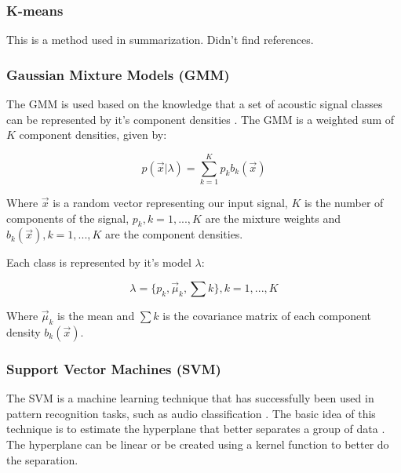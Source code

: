 \documentclass[12pt]{article}
\begin{document}
\subsubsection{K-means} \label{class:kmeans}

This is a method used in summarization. Didn't find references.

\subsubsection{Gaussian Mixture Models (GMM)} \label{class:gmm}


The GMM is used based on the knowledge that a set of acoustic signal classes can be represented by it's component densities \cite{reynolds1995robust}. The GMM is a weighted sum of $K$ component densities, given by:

\begin{equation}
	p(\vec{x}|\lambda) = \sum_{k=1}^{K} p_kb_k(\vec{x})
	\label{eq:gmm}
\end{equation}

Where $\vec{x}$ is a random vector representing our input signal, $K$ is the number of components of the signal, $p_k, k = 1,...,K$ are the mixture weights and $b_k(\vec{x}), k = 1,...,K$ are the component densities.

Each class is represented by it's model $\lambda$:

\begin{equation}
	\lambda = \{ p_k, \vec{\mu}_k, \sum k \}, k = 1,...,K
	\label{eq:lambda}
\end{equation}

Where $\vec{\mu}_k$ is the mean and $\sum k$ is the covariance matrix of each component density $b_k(\vec{x})$.



\subsubsection{Support Vector Machines (SVM)} \label{class:svm}


The SVM is a machine learning technique that has successfully been used in pattern recognition tasks, such as audio classification \cite{dhanalakshmi2009classification}. The basic idea of this technique is to estimate the hyperplane that better separates a group of data \cite{cumani2012analysis}. The hyperplane can be linear or be created using a kernel function to better do the separation.
\end{document}
